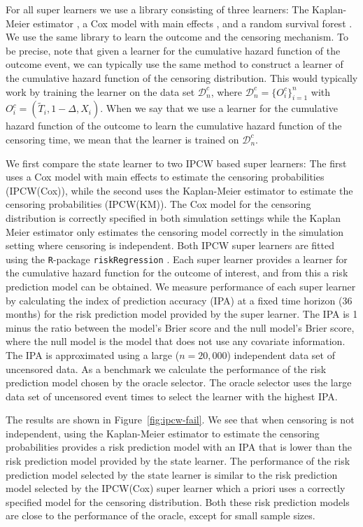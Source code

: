 \documentclass{statsoc}
\numberwithin{theorem}{section}
\newcommand{\1}{\mathds{1}}
\newcommand{\data}{\ensuremath{\mathcal{D}}}
\begin{document}
For all super learners we use a library consisting of three learners: The
Kaplan-Meier estimator \citep{kaplan1958nonparametric,Gerds_2019prodlim}, a Cox
model with main effects \citep{cox1972regression, survival-package}, and a
random survival forest \citep{ishwaran2008random,rfsrc-paclage}. We use the same
library to learn the outcome and the censoring mechanism. To be precise, note
that given a learner for the cumulative hazard function of the outcome event, we
can typically use the same method to construct a learner of the cumulative
hazard function of the censoring distribution. This would typically work by
training the learner on the data set \( \data_n^c \), where
\( \data_n^c = \{O_i^c\}_{i=1}^n \) with
\( O_i^c = (\tilde{T}_i, 1-\Delta, X_i) \). When we say that we use a learner
for the cumulative hazard function of the outcome to learn the cumulative hazard
function of the censoring time, we mean that the learner is trained on
\( \data_n^c \).

We first compare the state learner to two IPCW based super learners: The first
uses a Cox model with main effects to estimate the censoring probabilities
(IPCW(Cox)), while the second uses the Kaplan-Meier estimator to estimate the
censoring probabilities (IPCW(KM)). The Cox model for the censoring distribution
is correctly specified in both simulation settings while the Kaplan Meier
estimator only estimates the censoring model correctly in the simulation setting
where censoring is independent. Both IPCW super learners are fitted using the
\texttt{R}-package \texttt{riskRegression} \citep{Gerds_Ohlendorff_Ozenne_2023}.
Each super learner provides a learner for the cumulative hazard function for the
outcome of interest, and from this a risk prediction model can be obtained. We
measure performance of each super learner by calculating the index of prediction
accuracy (IPA) \citep{kattan2018index} at a fixed time horizon (36 months) for
the risk prediction model provided by the super learner. The IPA is 1 minus the
ratio between the model's Brier score and the null model's Brier score, where
the null model is the model that does not use any covariate information. The IPA
is approximated using a large (\( n = 20,000 \)) independent data set of
uncensored data. As a benchmark we calculate the performance of the risk
prediction model chosen by the oracle selector. The oracle selector uses the
large data set of uncensored event times to select the learner with the highest
IPA.

The results are shown in Figure~\ref{fig:ipcw-fail}. We see that when censoring
is not independent, using the Kaplan-Meier estimator to estimate the censoring
probabilities provides a risk prediction model with an IPA that is lower than
the risk prediction model provided by the state learner. The performance of the
risk prediction model selected by the state learner is similar to the risk
prediction model selected by the IPCW(Cox) super learner which a priori uses a
correctly specified model for the censoring distribution. Both these risk
prediction models are close to the performance of the oracle, except for small
sample sizes.
\end{document}
